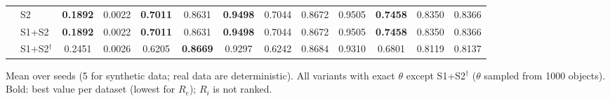 \begin{table}[!t]
\begin{tabular}{llccccccccccc}
 & S2 & \textbf{0.1892} & 0.0022 & \textbf{0.7011} & 0.8631 & \textbf{0.9498} & 0.7044 & 0.8672 & 0.9505 & \textbf{0.7458} & 0.8350 & 0.8366 \\
 & S1+S2 & \textbf{0.1892} & 0.0022 & \textbf{0.7011} & 0.8631 & \textbf{0.9498} & 0.7044 & 0.8672 & 0.9505 & \textbf{0.7458} & 0.8350 & 0.8366 \\
 & S1+S2$^{\dagger}$ & 0.2451 & 0.0026 & 0.6205 & \textbf{0.8669} & 0.9297 & 0.6242 & 0.8684 & 0.9310 & 0.6801 & 0.8119 & 0.8137 \\
\bottomrule
\end{tabular}
\vspace{2pt}
\parbox{\textwidth}{\footnotesize Mean over seeds (5 for synthetic data; real data are deterministic). All variants with exact $\theta$ except S1+S2$^{\dagger}$ ($\theta$ sampled from 1000 objects). Bold: best value per dataset (lowest for $R_e$); $R_i$ is not ranked.}
\end{table}